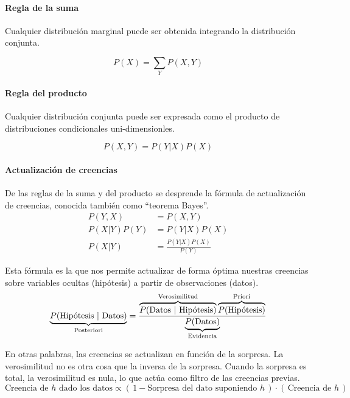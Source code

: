 \documentclass[a4paper,10pt]{article}
\begin{document}
 \paragraph{Regla de la suma} Cualquier distribución marginal puede ser obtenida integrando la distribución conjunta.
 
\begin{equation*}
 P(X) = \sum_Y P(X,Y)
\end{equation*}
 
\paragraph{Regla del producto} Cualquier distribución conjunta puede ser expresada como el producto de distribuciones condicionales uni-dimensionles.

\begin{equation*}
 P(X,Y) = P(Y|X) P(X)
\end{equation*}

\paragraph{Actualizaci\'on de creencias} De las reglas de la suma y del producto se desprende la f\'ormula de actualizaci\'on de creencias, conocida tambi\'en como ``teorema Bayes''.
\begin{equation}
\begin{split}
 P(Y,X) &= P(X,Y) \\
  P(X|Y) P(Y) & = P(Y|X) P(X) \\
  P(X|Y)  & = \frac{P(Y|X) P(X)}{P(Y)}
 \end{split}
\end{equation}

Esta f\'ormula es la que nos permite actualizar de forma \'optima nuestras creencias sobre variables ocultas (hip\'otesis) a partir de observaciones (datos).
\begin{equation}
\underbrace{P(\text{Hip\'otesis }|\text{ Datos})}_{\text{\scriptsize Posteriori}} = \frac{\overbrace{P(\text{Datos }|\text{ Hip\'otesis})}^{\text{\scriptsize Verosimilitud}} \overbrace{P(\text{Hip\'otesis})}^{\text{\scriptsize Priori}} }{\underbrace{P(\text{Datos})}_{\text{\scriptsize Evidencia}}}
\end{equation}

En otras palabras, las creencias se actualizan en funci\'on de la sorpresa.
La verosimilitud no es otra cosa que la inversa de la sorpresa.
Cuando la sorpresa es total, la verosimilitud es nula, lo que act\'ua como filtro de las creencias previas.
\begin{equation}
 \text{Creencia de $h$ dado los datos} \propto (\,1-\text{Sorpresa del dato suponiendo $h$}\,) \cdot (\,\text{Creencia de $h$}\,)
\end{equation}
\end{document}
